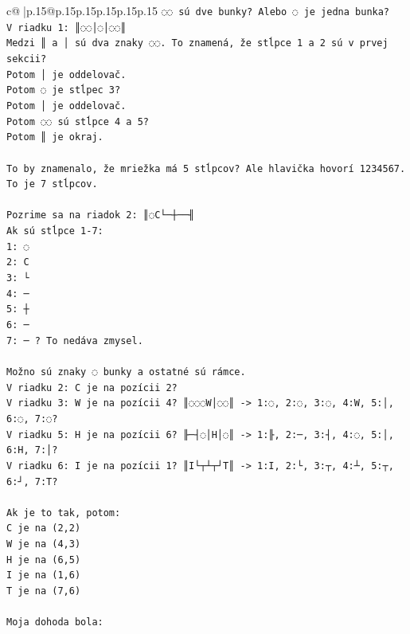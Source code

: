 \documentclass{article}
\begin{document}
{\begin{supertabular}{c@{$\;$}|p{.15\linewidth}@{}p{.15\linewidth}p{.15\linewidth}p{.15\linewidth}p{.15\linewidth}p{.15\linewidth}}
{{{\texttt{◌◌ sú dve bunky? Alebo ◌ je jedna bunka?} \\
\texttt{V riadku 1: ║◌◌│◌│◌◌║} \\
\texttt{Medzi ║ a │ sú dva znaky ◌◌. To znamená, že stĺpce 1 a 2 sú v prvej sekcii?} \\
\texttt{Potom │ je oddelovač.} \\
\texttt{Potom ◌ je stĺpec 3?} \\
\texttt{Potom │ je oddelovač.} \\
\texttt{Potom ◌◌ sú stĺpce 4 a 5?} \\
\texttt{Potom ║ je okraj.} \\
\\ 
\texttt{To by znamenalo, že mriežka má 5 stĺpcov? Ale hlavička hovorí 1234567. To je 7 stĺpcov.} \\
\\ 
\texttt{Pozrime sa na riadok 2: ║◌C└─┼──╢} \\
\texttt{Ak sú stĺpce 1{-}7:} \\
\texttt{1: ◌} \\
\texttt{2: C} \\
\texttt{3: └} \\
\texttt{4: ─} \\
\texttt{5: ┼} \\
\texttt{6: ─} \\
\texttt{7: ─ ? To nedáva zmysel.} \\
\\ 
\texttt{Možno sú znaky ◌ bunky a ostatné sú rámce.} \\
\texttt{V riadku 2: C je na pozícii 2?} \\
\texttt{V riadku 3: W je na pozícii 4? ║◌◌◌W│◌◌║ {-}> 1:◌, 2:◌, 3:◌, 4:W, 5:│, 6:◌, 7:◌?} \\
\texttt{V riadku 5: H je na pozícii 6? ╟─┤◌│H│◌║ {-}> 1:╟, 2:─, 3:┤, 4:◌, 5:│, 6:H, 7:│?} \\
\texttt{V riadku 6: I je na pozícii 1? ║I└┬┴┬┘T║ {-}> 1:I, 2:└, 3:┬, 4:┴, 5:┬, 6:┘, 7:T?} \\
\\ 
\texttt{Ak je to tak, potom:} \\
\texttt{C je na (2,2)} \\
\texttt{W je na (4,3)} \\
\texttt{H je na (6,5)} \\
\texttt{I je na (1,6)} \\
\texttt{T je na (7,6)} \\
\\ 
\texttt{Moja dohoda bola:} \\
}}}
\end{supertabular}}
\end{document}
